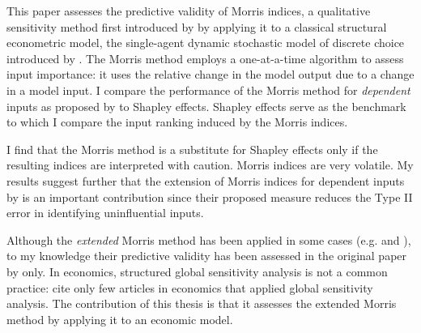 This paper assesses the predictive validity of Morris indices, a qualitative sensitivity method first introduced by \citep{M91} by applying it to a classical structural econometric model, the single-agent dynamic stochastic model of discrete choice introduced by \citet{R87}. The Morris method employs a one-at-a-time algorithm to assess input importance: it uses the relative change in the model output due to a change in a model input. I compare the performance of the Morris method for \textit{dependent} inputs as proposed by \citet{GM17} to Shapley effects. Shapley effects serve as the benchmark to which I compare the input ranking induced by the Morris indices.

I find that the Morris method is a substitute for Shapley effects only if the resulting indices are interpreted with caution. Morris indices are very volatile. %
My results suggest further that the extension of Morris indices for dependent inputs by \citet{GM17} is an important contribution since their proposed measure reduces the Type II error in identifying uninfluential inputs.

Although the \textit{extended} Morris method has been applied in some cases (e.g. \citet{MMA18} and \citet{RZY19}), to my knowledge their predictive validity has been assessed in the original paper by \citet{GM17} only. In economics, structured global sensitivity analysis is not a common practice: \citet{HMSW19} cite only few articles in economics that applied global sensitivity analysis. The contribution of this thesis is that it assesses the extended Morris method by applying it to an economic model.



